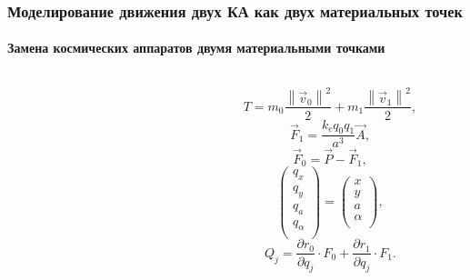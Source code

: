 \documentclass[10pt,pdf,hyperref={unicode}]{beamer}
\newcommand{\norm}[1]{\left\lVert#1\right\rVert}%
\begin{document}
\begin{frame}
\frametitle{Моделирование движения двух КА как двух материальных точек}
\framesubtitle{Замена космических аппаратов двумя материальными точками}
\begin{columns}[onlytextwidth]
	\begin{column}{0.5\textwidth}
	\begin{figure}[H]
	\end{figure}
	\end{column}
	\begin{column}{0.5\textwidth}
		\begin{equation*}
			T = m_0 \frac{\norm{\vec{v}_0}^2}{2} + m_1 \frac{\norm{\vec{v}_1}^2}{2},
		\end{equation*}
		\begin{equation*}
			\vec{F}_1 = \frac{k_c q_0 q_1}{a^3}\vec{A},
		\end{equation*}
		\begin{equation*}
			\vec{F}_0 = \vec{P} - \vec{F}_1,
		\end{equation*}
		\begin{equation*}
			\begin{pmatrix}
				q_x \\
				q_y \\
				q_a \\
				q_\alpha \\
			\end{pmatrix} 
			=
			\begin{pmatrix}
				x \\
				y \\
				a \\
				\alpha \\
			\end{pmatrix},
		\end{equation*}
		\begin{equation*}
			Q_j = \frac{\partial r_0}{\partial q_j} \cdot F_0 + \frac{\partial r_1}{\partial q_j} \cdot F_1.
		\end{equation*}
	\end{column}
\end{columns}
\end{frame}
\end{document}
